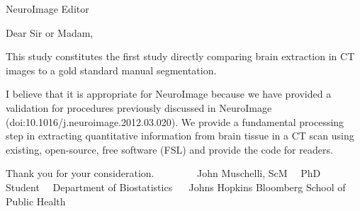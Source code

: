 \documentclass{scrlttr2}
\renewcommand{\\}{\ {\large\textperiodcentered}\ }
\begin{document}

\begin{letter}{
NeuroImage Editor
}


\opening{Dear Sir or Madam,}

This study constitutes the first study directly comparing brain extraction in CT images to a gold standard manual segmentation.  

I believe that it is appropriate for NeuroImage because we have provided a validation for procedures previously discussed in NeuroImage (doi:10.1016/j.neuroimage.2012.03.020).  We provide a fundamental processing step in extracting quantitative information from brain tissue in a CT scan using existing, open-source, free software (FSL) and provide the code for readers.


Thank you for your consideration.
 \\ \\ \\
John Muschelli, ScM\\
PhD Student\\
Department of Biostatistics \\
Johns Hopkins Bloomberg School of Public Health



\end{letter}
\end{document}
